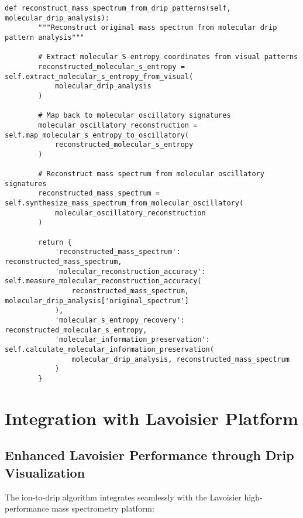 \documentclass[12pt,a4paper]{article}
\begin{document}
\begin{lstlisting}[style=pythonstyle, caption=Computer Vision Molecular Pattern Analysis]
    def reconstruct_mass_spectrum_from_drip_patterns(self, molecular_drip_analysis):
        """Reconstruct original mass spectrum from molecular drip pattern analysis"""
        
        # Extract molecular S-entropy coordinates from visual patterns
        reconstructed_molecular_s_entropy = self.extract_molecular_s_entropy_from_visual(
            molecular_drip_analysis
        )
        
        # Map back to molecular oscillatory signatures
        molecular_oscillatory_reconstruction = self.map_molecular_s_entropy_to_oscillatory(
            reconstructed_molecular_s_entropy
        )
        
        # Reconstruct mass spectrum from molecular oscillatory signatures
        reconstructed_mass_spectrum = self.synthesize_mass_spectrum_from_molecular_oscillatory(
            molecular_oscillatory_reconstruction
        )
        
        return {
            'reconstructed_mass_spectrum': reconstructed_mass_spectrum,
            'molecular_reconstruction_accuracy': self.measure_molecular_reconstruction_accuracy(
                reconstructed_mass_spectrum, molecular_drip_analysis['original_spectrum']
            ),
            'molecular_s_entropy_recovery': reconstructed_molecular_s_entropy,
            'molecular_information_preservation': self.calculate_molecular_information_preservation(
                molecular_drip_analysis, reconstructed_mass_spectrum
            )
        }
\end{lstlisting}

\section{Integration with Lavoisier Platform}

\subsection{Enhanced Lavoisier Performance through Drip Visualization}

The ion-to-drip algorithm integrates seamlessly with the Lavoisier high-performance mass spectrometry platform:
\end{document}
